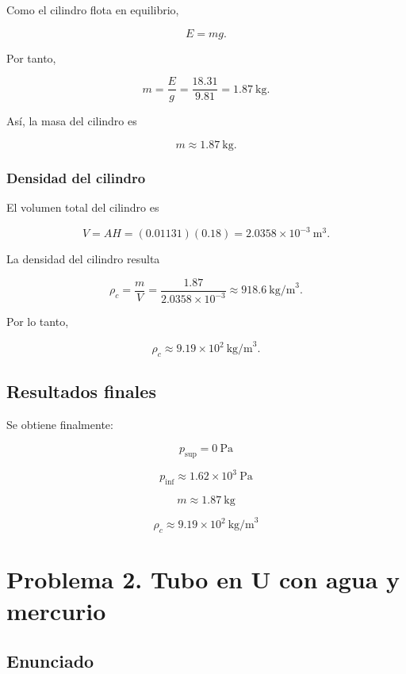 \documentclass[
  letterpaper,
  DIV=11,
  numbers=noendperiod]{scrreprt}
\begin{document}
Como el cilindro flota en equilibrio,

\[
E=mg.
\]

Por tanto,

\[
m=\frac{E}{g}=\frac{18.31}{9.81}=1.87\ \text{kg}.
\]

Así, la masa del cilindro es

\[
\boxed{m\approx 1.87\ \text{kg}}.
\]

\subsection*{Densidad del cilindro}\label{densidad-del-cilindro}

El volumen total del cilindro es

\[
V=AH=(0.01131)(0.18)=2.0358\times10^{-3}\ \text{m}^3.
\]

La densidad del cilindro resulta

\[
\rho_c=\frac{m}{V}
=
\frac{1.87}{2.0358\times10^{-3}}
\approx 918.6\ \text{kg/m}^3.
\]

Por lo tanto,

\[
\boxed{\rho_c\approx 9.19\times10^2\ \text{kg/m}^3}.
\]

\section*{Resultados finales}\label{resultados-finales}


Se obtiene finalmente:

\[
\boxed{p_{\text{sup}}=0\ \text{Pa}}
\]

\[
\boxed{p_{\text{inf}}\approx 1.62\times10^3\ \text{Pa}}
\]

\[
\boxed{m\approx 1.87\ \text{kg}}
\]

\[
\boxed{\rho_c\approx 9.19\times10^2\ \text{kg/m}^3}
\]

\chapter{Problema 2. Tubo en U con agua y
mercurio}\label{problema-2.-tubo-en-u-con-agua-y-mercurio}

\section*{Enunciado}\label{enunciado-1}
\end{document}
